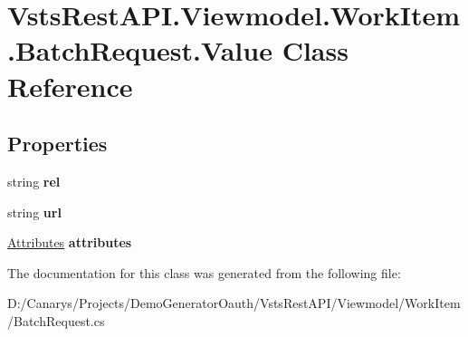 \hypertarget{class_vsts_rest_a_p_i_1_1_viewmodel_1_1_work_item_1_1_batch_request_1_1_value}{}\section{Vsts\+Rest\+A\+P\+I.\+Viewmodel.\+Work\+Item.\+Batch\+Request.\+Value Class Reference}
\label{class_vsts_rest_a_p_i_1_1_viewmodel_1_1_work_item_1_1_batch_request_1_1_value}
\subsection*{Properties}
\begin{DoxyCompactItemize}
\item 
\mbox{\label{class_vsts_rest_a_p_i_1_1_viewmodel_1_1_work_item_1_1_batch_request_1_1_value_a0bffacb011159656521f687b4387ae49}} 
string {\bfseries rel}
\item 
\mbox{\label{class_vsts_rest_a_p_i_1_1_viewmodel_1_1_work_item_1_1_batch_request_1_1_value_a3ca12befdbb22c37ba04295921741b76}} 
string {\bfseries url}
\item 
\mbox{\label{class_vsts_rest_a_p_i_1_1_viewmodel_1_1_work_item_1_1_batch_request_1_1_value_a59005c2f94e25a98dfba7e4e815284f4}} 
\mbox{\hyperlink{class_vsts_rest_a_p_i_1_1_viewmodel_1_1_work_item_1_1_batch_request_1_1_attributes}{Attributes}} {\bfseries attributes}
\end{DoxyCompactItemize}


The documentation for this class was generated from the following file\+:\begin{DoxyCompactItemize}
\item 
D\+:/\+Canarys/\+Projects/\+Demo\+Generator\+Oauth/\+Vsts\+Rest\+A\+P\+I/\+Viewmodel/\+Work\+Item/Batch\+Request.\+cs\end{DoxyCompactItemize}
